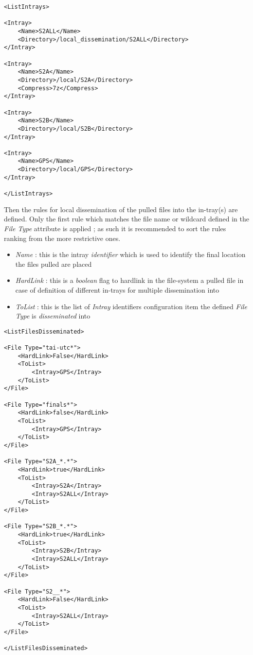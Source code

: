 \documentclass[dec_sum_main.tex]{subfiles}
\begin{document}
\begin{lstlisting}
<ListIntrays>

<Intray>
	<Name>S2ALL</Name>
	<Directory>/local_dissemination/S2ALL</Directory>
</Intray>

<Intray>
	<Name>S2A</Name>
	<Directory>/local/S2A</Directory>
	<Compress>7z</Compress>
</Intray>

<Intray>
	<Name>S2B</Name>
	<Directory>/local/S2B</Directory>
</Intray>

<Intray>
	<Name>GPS</Name>
	<Directory>/local/GPS</Directory>
</Intray>

</ListIntrays>

\end{lstlisting}

\par
\noindent
\label{Intray}
Then the rules for local dissemination of the pulled files into the in-tray(s) are defined. Only the first rule which matches the file name or wildcard defined in the \textit{File Type} attribute is applied ; as such it is recommended to sort the rules ranking from the more restrictive ones.  
\par
\noindent
\begin{itemize}
	\item \textit{Name} : this is the intray \textit{identifier} which is used to identify the final location the files pulled are placed
	\item \textit{HardLink} : this is a \textit{boolean} flag to hardlink in the file-system a pulled file in case of definition of different in-trays for multiple dissemination into
	\item \textit{ToList} : this is the list of \textit{Intray} identifiers configuration item the defined \textit{File Type} is \textit{disseminated} into 
\end{itemize}
\begin{lstlisting}
<ListFilesDisseminated>

<File Type="tai-utc*">
	<HardLink>False</HardLink>
	<ToList>
		<Intray>GPS</Intray>
	</ToList>
</File>

<File Type="finals*">
	<HardLink>false</HardLink>
	<ToList>
		<Intray>GPS</Intray>
	</ToList>
</File>

<File Type="S2A_*.*">
	<HardLink>true</HardLink>
	<ToList>
		<Intray>S2A</Intray>
		<Intray>S2ALL</Intray>
	</ToList>
</File>

<File Type="S2B_*.*">
	<HardLink>true</HardLink>
	<ToList>
		<Intray>S2B</Intray>
		<Intray>S2ALL</Intray>
	</ToList>
</File>

<File Type="S2__*">
	<HardLink>False</HardLink>
	<ToList>
		<Intray>S2ALL</Intray>
	</ToList>
</File>

</ListFilesDisseminated>

\end{lstlisting}
\end{document}
